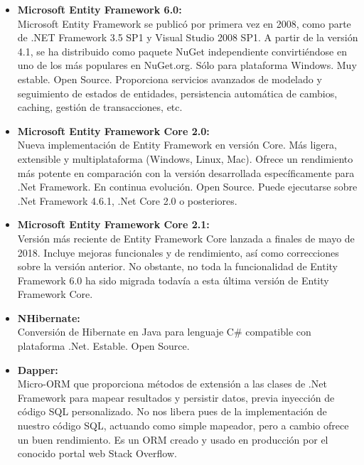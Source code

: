 \documentclass[preprint,12pt]{elsarticle}
\begin{document}
\begin{itemize}
	
	\item \textbf{Microsoft Entity Framework 6.0:} \\Microsoft Entity Framework se publicó por primera vez en 2008, como parte de .NET Framework 3.5 SP1 y Visual Studio 2008 SP1. A partir de la versión 4.1, se ha distribuido como paquete NuGet independiente convirtiéndose en uno de los más populares en NuGet.org. Sólo para plataforma Windows. Muy estable. Open Source. Proporciona servicios avanzados de modelado y seguimiento de estados de entidades, persistencia automática de cambios, caching, gestión de transacciones, etc.
	
	\item \textbf{Microsoft Entity Framework Core 2.0:} \\Nueva implementación de Entity Framework en versión Core. Más ligera, extensible y multiplataforma (Windows, Linux, Mac). Ofrece un rendimiento más potente en comparación con la versión desarrollada específicamente para .Net Framework. En continua evolución. Open Source. Puede ejecutarse sobre .Net Framework 4.6.1, .Net Core 2.0 o posteriores. 
	
	\item \textbf{Microsoft Entity Framework Core 2.1:} \\Versión más reciente de Entity Framework Core lanzada a finales de mayo de 2018. Incluye mejoras funcionales y de rendimiento, así como correcciones sobre la versión anterior. No obstante, no toda la funcionalidad de Entity Framework 6.0 ha sido migrada todavía a esta última versión de Entity Framework Core.
	
	\item \textbf{NHibernate:} \\Conversión de Hibernate en Java para lenguaje C\# compatible con plataforma .Net. Estable. Open Source.
		
	\item \textbf{Dapper:} \\Micro-ORM que proporciona métodos de extensión a las clases de .Net Framework para mapear resultados y persistir datos, previa inyección de código SQL personalizado. No nos libera pues de la implementación de nuestro código SQL, actuando como simple mapeador, pero a cambio ofrece un buen rendimiento. Es un ORM creado y usado en producción por el conocido portal web Stack Overflow. \cite{Deloitte1}

\end{itemize}
\end{document}
